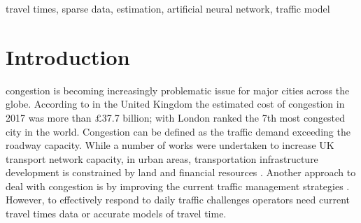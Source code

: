 \documentclass[journal]{IEEEtran}
\begin{document}
\begin{IEEEkeywords}
travel times, sparse data, estimation, artificial neural network, traffic model
\end{IEEEkeywords}






%
\IEEEpeerreviewmaketitle



\section{Introduction}
\label{sec:introduction}
% 
% 
% 
% 
 congestion is becoming increasingly problematic issue for major cities across the globe. According to \cite{Cookson2017} in the United Kingdom the estimated cost of congestion in 2017 was more than $\pounds$37.7 billion; with London ranked the 7th most congested city in the world. Congestion can be defined as the traffic demand exceeding the roadway capacity. While a number of works were undertaken to increase UK transport network capacity, in urban areas, transportation infrastructure development is constrained by land and financial resources \cite{Petrovska2015}. Another approach to deal with congestion is by improving the current traffic management strategies \cite{Capes2005}. However, to effectively respond to daily traffic challenges operators need current travel times data or accurate models of travel time. 
\end{document}
